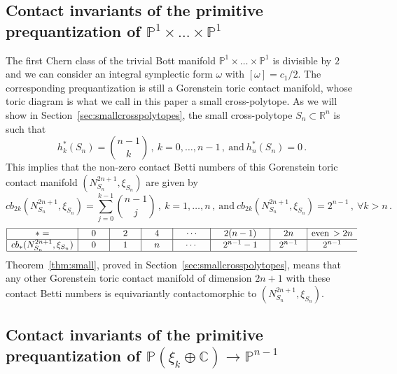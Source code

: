 \documentclass[a4paper,11pt,reqno]{amsart}
\newcommand{\R}{\mathbb R}
\newcommand{\C}{\mathbb C}
\newcommand{\CP}{\mathbb P}
\begin{document}
\subsection{Contact invariants of the primitive prequantization of $\CP^1 \times \dots \times \CP^1$}
\label{ssec:primitive1}

The first Chern class of the trivial Bott manifold $\CP^1 \times \dots \times \CP^1$ is divisible by $2$ and we 
can consider an integral symplectic form $\omega$ with $[\omega] = c_1 /2$. The corresponding prequantization 
is still a Gorenstein toric contact manifold, whose toric diagram is what we call in this paper a small cross-polytope.
As we will show in Section~\ref{sec:smallcrosspolytopes}, the small cross-polytope $S_n \subset \R^n$ is such that
\[
h^\ast_k (S_n) = \binom{n-1}{k}\,,\ k=0,\ldots,n-1\,, \ \text{and}\ h^\ast_n (S_n) = 0\,.
\]
This implies that the non-zero contact Betti numbers of this Gorenstein toric contact manifold 
$(N^{2n+1}_{S_n}, \xi_{S_n})$ are given by
\[
cb_{2k} (N^{2n+1}_{S_n}, \xi_{S_n}) = \sum_{j=0}^{k-1}  \binom{n-1}{j}\,,\ k=1, \ldots, n\,, \ \text{and} \ 
cb_{2k} (N^{2n+1}_{S_n}, \xi_{S_n}) = 2^{n-1}\,,\ \forall k>n\,.
\]
\begin{equation*}
\begin{array}{|c|c|c|c|c|c|c|cl} \hline
  \ast =  & \quad   0 \quad  & \quad 2 \quad & \quad 4 \quad & \quad \cdots \quad & \quad 2(n-1) \quad & \quad 2n \quad & \text{even}\, > 2n
\\ 
\hline 
cb_\ast (N^{2n+1}_{S_n}, \xi_{S_n}) &   0   & 1 & n & \cdots & 2^{n-1} -1 & 2^{n-1} &  2^{n-1}
\\
\hline
\end{array}
\end{equation*}
Theorem~\ref{thm:small}, proved in Section~\ref{sec:smallcrosspolytopes}, means that any other Gorenstein toric contact manifold 
of dimension $2n+1$ with these contact Betti numbers is equivariantly contactomorphic to $(N^{2n+1}_{S_n}, \xi_{S_n})$.

\subsection{Contact invariants of the primitive prequantization of $\CP(\xi_k \oplus \C) \to \CP^{n-1}$}
\label{ssec:primitive2}
\end{document}
